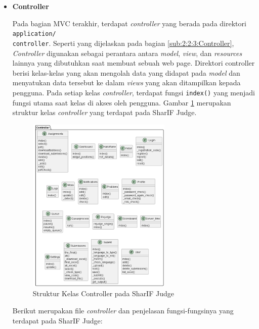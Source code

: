 \documentclass[a4paper,twoside]{article}
\begin{document}
\begin{enumerate}
\begin{itemize}
\begin{itemize}
		            \end{itemize}

		            \newpage

		      \item \textbf{Controller}
		            \label{sub:3:1:1:controller}

		            Pada bagian MVC terakhir, terdapat \textit{controller} yang berada pada direktori \verb|application/| \\ \verb|controller|. Seperti yang dijelaskan pada bagian \ref{sub:2:2:3:Controller}, \textit{Controller} digunakan sebagai perantara antara \textit{model}, \textit{view}, dan \textit{resources} lainnya yang dibutuhkan saat membuat sebuah web page. Direktori controller berisi kelas-kelas yang akan mengolah data yang didapat pada \textit{model} dan menyatukan data tersebut ke dalam \textit{views} yang akan ditampilkan kepada pengguna. Pada setiap kelas \textit{controller}, terdapat fungsi \verb|index()| yang menjadi fungsi utama saat kelas di akses oleh pengguna.
		            Gambar \ref{fig:3:1:1:controller} merupakan struktur kelas \textit{controller} yang terdapat pada SharIF Judge.
		            \begin{figure}[H]
			            \centering
			            \includegraphics[width=0.65\textwidth]{analisis/mvc/controller.png}
			            \caption{Struktur Kelas Controller pada SharIF Judge}
			            \label{fig:3:1:1:controller}
		            \end{figure}
		            Berikut merupakan file \textit{controller} dan penjelasan fungsi-fungsinya yang terdapat pada SharIF Judge:


\end{itemize}
\end{enumerate}
\end{document}
